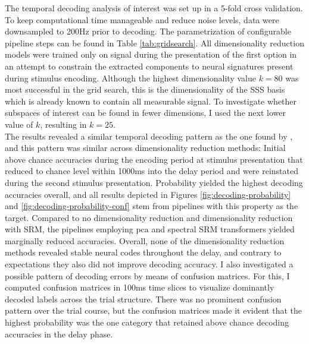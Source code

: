 The temporal decoding analysis of interest was set up in a 5-fold cross validation.
To keep computational time manageable and reduce noise levels, data were downsampled to 200Hz prior to decoding.
The parametrization of configurable pipeline steps can be found in Table \ref{tab:gridsearch}.
All dimensionality reduction models were trained only on signal during the presentation of the first option in an attempt to constrain the extracted components to neural signatures present during stimulus encoding.
Although the highest dimensionality value $k = 80$ was most successful in the grid search, this is the dimensionality of the \gls{SSS} basis which is already known to contain all measurable signal.
To investigate whether subspaces of interest can be found in fewer dimensions, I used the next lower value of $k$, resulting in $k = 25$.\\
The results revealed a similar temporal decoding pattern as the one found by \citet{kaiserposter}, and this pattern was similar across dimensionality reduction methods:
Initial above chance accuracies during the encoding period at stimulus presentation that reduced to chance level within 1000ms into the delay period and were reinstated during the second stimulus presentation.
Probability yielded the highest decoding accuracies overall, and all results depicted in Figures \ref{fig:decoding-probability} and \ref{fig:decoding-probability-conf} stem from pipelines with this property as the target.
Compared to no dimensionality reduction and dimensionality reduction with \gls{SRM}, the pipelines employing \gls{pca} and spectral \gls{SRM} transformers yielded marginally reduced accuracies.
Overall, none of the dimensionality reduction methods revealed stable neural codes throughout the delay, and contrary to expectations they also did not improve decoding accuracy.
I also investigated a possible pattern of decoding errors by means of confusion matrices.
For this, I computed confusion matrices in 100ms time slices to visualize dominantly decoded labels across the trial structure.
There was no prominent confusion pattern over the trial course, but the confusion matrices made it evident that the highest probability was the one category that retained above chance decoding accuracies in the delay phase.


